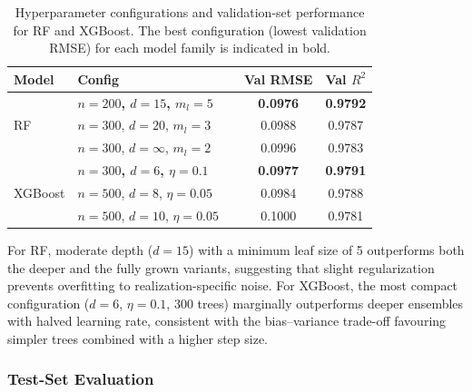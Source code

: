 \documentclass[12pt, a4paper]{article}
\begin{document}
\begin{table}[H]
  \centering
  \caption{Hyperparameter configurations and validation-set performance for RF and XGBoost.  The best configuration (lowest validation RMSE) for each model family is indicated in bold.}
  \label{tab:tree_hp}
  \begin{tabular}{@{}lllcc@{}}
    \toprule
    Model & Config & & Val RMSE & Val $R^2$ \\
    \midrule
    \multirow{3}{*}{RF}
      & \textbf{$n = 200$, $d = 15$, $m_l = 5$}  && \textbf{0.0976} & \textbf{0.9792} \\
      & $n = 300$, $d = 20$, $m_l = 3$            && 0.0988 & 0.9787 \\
      & $n = 300$, $d = \infty$, $m_l = 2$        && 0.0996 & 0.9783 \\
    \midrule
    \multirow{3}{*}{XGBoost}
      & \textbf{$n = 300$, $d = 6$, $\eta = 0.1$} && \textbf{0.0977} & \textbf{0.9791} \\
      & $n = 500$, $d = 8$, $\eta = 0.05$         && 0.0984 & 0.9788 \\
      & $n = 500$, $d = 10$, $\eta = 0.05$        && 0.1000 & 0.9781 \\
    \bottomrule
  \end{tabular}
\end{table}

For RF, moderate depth ($d = 15$) with a minimum leaf size of 5 outperforms both the deeper and the fully grown variants, suggesting that slight regularization prevents overfitting to realization-specific noise.  For XGBoost, the most compact configuration ($d = 6$, $\eta = 0.1$, 300 trees) marginally outperforms deeper ensembles with halved learning rate, consistent with the bias--variance trade-off favouring simpler trees combined with a higher step size.

\subsubsection{Test-Set Evaluation}
\label{sec:tree_eval}
\end{document}
